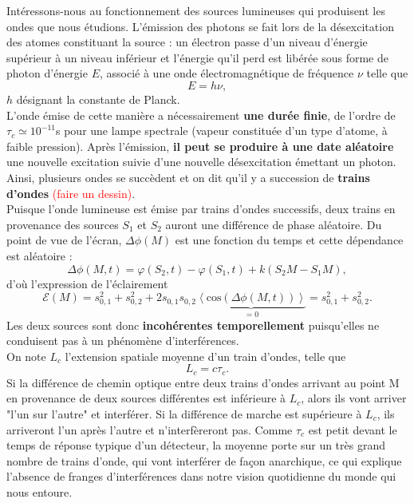 \documentclass[11pt,a4paper]{report}
\begin{document}
Intéressons-nous au fonctionnement des sources lumineuses qui produisent les ondes que nous étudions. L'émission des photons se fait lors de la désexcitation des atomes constituant la source : un électron passe d'un niveau d'énergie supérieur à un niveau inférieur et l'énergie qu'il perd est libérée sous forme de photon d'énergie $E$, associé à une onde électromagnétique de fréquence $\nu$ telle que
\begin{equation}
	E = h\nu,
\end{equation}
$h$ désignant la constante de Planck.\\

L'onde émise de cette manière a nécessairement \textbf{une durée finie}, de l'ordre de $\tau_c \simeq 10^{-11}$s pour une lampe spectrale (vapeur constituée d'un type d'atome, à faible pression). Après l'émission, \textbf{il peut se produire à une date aléatoire} une nouvelle excitation suivie d'une nouvelle désexcitation émettant un photon. Ainsi, plusieurs ondes se succèdent et on dit qu'il y a succession de \textbf{trains d'ondes} \textcolor{red}{(faire un dessin)}. \\

Puisque l'onde lumineuse est émise par trains d'ondes successifs, deux trains en provenance des sources $S_1$ et $S_2$ auront une différence de phase aléatoire. Du point de vue de l'écran, $\Delta\phi(M)$ est une fonction du temps et cette dépendance est aléatoire :
\begin{equation}
	\Delta\phi(M,t) = \varphi(S_2,t) - \varphi(S_1,t) + k\left(S_2M - S_1M\right),
\end{equation}
d'où l'expression de l'éclairement
\begin{equation}
	\mathcal{E}(M) = s_{0,1}^2 + s_{0,2}^2 + 2 s_{0,1} s_{0,2} 
	\underbrace{\left\langle\text{cos}\left(\Delta\phi(M,t)\right) \right\rangle}_{= 0} 
	= s_{0,1}^2 + s_{0,2}^2.
	\label{eq:12}
\end{equation}
Les deux sources sont donc \textbf{incohérentes temporellement} puisqu'elles ne conduisent pas à un phénomène d'interférences.\\

On note $L_c$ l'extension spatiale moyenne d'un train d'ondes, telle que
\begin{equation}
	\boxed{L_c = c\tau_c}.
\end{equation}
Si la différence de chemin optique entre deux trains d'ondes arrivant au point M en provenance de deux sources différentes est inférieure à $L_c$, alors ils vont arriver "l'un sur l'autre" et interférer. Si la différence de marche est supérieure à $L_c$, ils arriveront l'un après l'autre et n'interfèreront pas. Comme $\tau_c$ est petit devant le temps de réponse typique d'un détecteur, la moyenne porte sur un très grand nombre de trains d'onde, qui vont interférer de façon anarchique, ce qui explique l'absence de franges d'interférences dans notre vision quotidienne du monde qui nous entoure.\\
\end{document}
